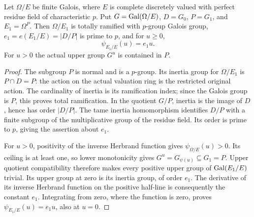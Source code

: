 \begin{lemma}
\label{fw:wild-fixed-tame-field}
\leanok
Let $\Omega/E$ be finite Galois, where $E$ is complete discretely
valued with perfect residue field of characteristic $p$. Put
$G=\operatorname{Gal}(\Omega/E)$, $D=G_0$, $P=G_1$, and $E_1=\Omega^P$.
Then $\Omega/E_1$ is totally ramified with $p$-group Galois group,
$e_1=e(E_1/E)=|D/P|$ is prime to $p$, and for $u\geq0$,
\[
 \psi_{E_1/E}(u)=e_1u.
\]
For $u>0$ the actual upper group $G^u$ is contained in $P$.
\end{lemma}
\begin{proof}
The subgroup $P$ is normal and is a $p$-group. Its inertia group
for $\Omega/E_1$ is $P\cap D=P$: the action on the actual
valuation ring is the restricted original action. The cardinality
of inertia is its ramification index; since the Galois group is
$P$, this proves total ramification. In the quotient $G/P$, inertia
is the image of $D$, hence has order $|D/P|$. The tame inertia
homomorphism identifies $D/P$ with a finite subgroup of the
multiplicative group of the residue field. Its order is prime to
$p$, giving the assertion about $e_1$.

For $u>0$, positivity of the inverse Herbrand function gives
$\psi_{\Omega/E}(u)>0$. Its ceiling is at least one, so lower
monotonicity gives $G^u=G_{\psi(u)}\subseteq G_1=P$.
Upper quotient compatibility therefore makes every positive upper
group of $\operatorname{Gal}(E_1/E)$ trivial. Its upper group at zero is its
inertia group, of order $e_1$. The derivative of its inverse
Herbrand function on the positive half-line is consequently the
constant $e_1$. Integrating from zero, where the function is zero,
proves $\psi_{E_1/E}(u)=e_1u$, also at $u=0$.
\end{proof}

